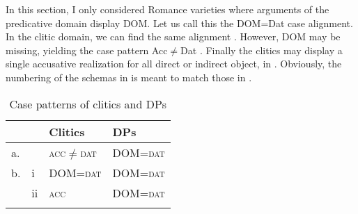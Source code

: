 \documentclass[output=paper,colorlinks,citecolor=brown,nonflat]{./langscibook}
\begin{document}
In this section, I only considered Romance varieties where arguments of the predicative domain display DOM. Let us call this the DOM=Dat case alignment. In the clitic domain, we can find the same alignment . However, DOM may be missing, yielding the case pattern Acc${\neq}$Dat . Finally the clitics may display a single accusative realization for all direct or indirect object, in . Obviously, the numbering of the schemas in  is meant to match those in .
%

\begin{table}
 \caption{\label{extab:manzini:30}Case patterns of clitics and DPs}
 \begin{tabular}{llll}
 \lsptoprule
    &    & Clitics        & DPs     \\
 \midrule
 a. &    & \textsc{acc}${\neq}$\textsc{dat} & DOM=\textsc{dat} \\
 b. & i  & DOM=\textsc{dat}       & DOM=\textsc{dat} \\
    & ii & \textsc{acc}            & DOM=\textsc{dat} \\
 \lspbottomrule
 \end{tabular}
 \end{table}
\end{document}
